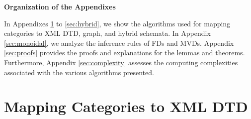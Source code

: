
\newpage

\noindent \textbf{Organization of the Appendixes}  ~~ 


In Appendixes \ref{sec:XMLDTD} to \ref{sec:hybrid}, we show the algorithms used for mapping categories to XML DTD, graph, and hybrid schemata. In Appendix \ref{sec:monoidal}, we analyze the inference rules of FDs and MVDs.  Appendix \ref{sec:proofs} provides the proofs and explanations for the lemmas and theorems. Furthermore, Appendix \ref{sec:complexity} assesses the computing complexities associated with the various algorithms presented. 







\section{Mapping Categories to XML DTD}
\label{sec:XMLDTD}

